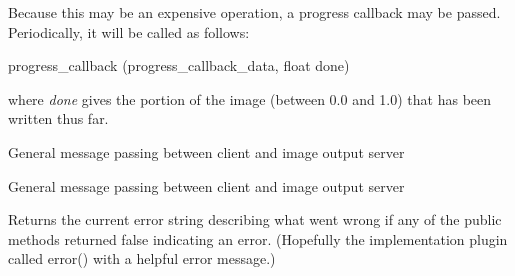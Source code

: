Because this may be an expensive operation, a progress callback may be passed.
Periodically, it will be called as follows:
\begin{code}
        progress_callback (progress_callback_data, float done)
\end{code}
\noindent where \emph{done} gives the portion of the image 
(between 0.0 and 1.0) that has been written thus far.

\apiend

General message passing between client and image output server
\apiend

General message passing between client and image output server
\apiend

Returns the current error string describing what went wrong if
any of the public methods returned {\kw false} indicating an error.
(Hopefully the implementation plugin called {\kw error()} with a
helpful error message.)
\apiend




\chapwidthend
